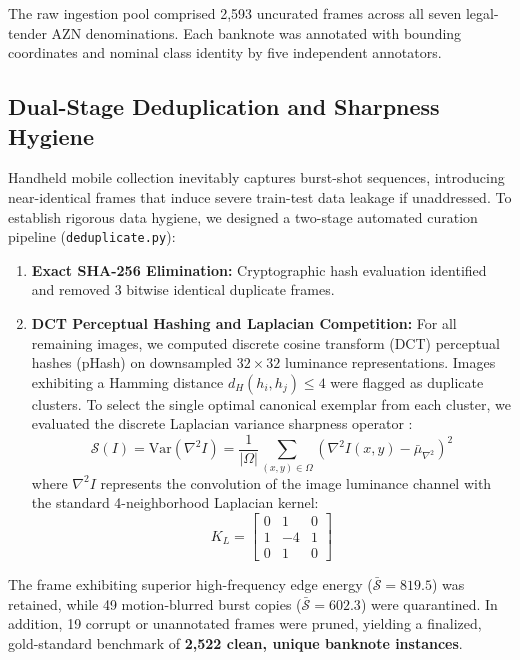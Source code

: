 \documentclass[conference]{IEEEtran}
\begin{document}
The raw ingestion pool comprised 2,593 uncurated frames across all seven legal-tender AZN denominations. Each banknote was annotated with bounding coordinates and nominal class identity by five independent annotators.

\subsection{Dual-Stage Deduplication and Sharpness Hygiene}
Handheld mobile collection inevitably captures burst-shot sequences, introducing near-identical frames that induce severe train-test data leakage if unaddressed. To establish rigorous data hygiene, we designed a two-stage automated curation pipeline (\texttt{deduplicate.py}):

\begin{enumerate}
    \item \textbf{Exact SHA-256 Elimination:} Cryptographic hash evaluation identified and removed 3 bitwise identical duplicate frames.
    \item \textbf{DCT Perceptual Hashing and Laplacian Competition:} For all remaining images, we computed discrete cosine transform (DCT) perceptual hashes (pHash) \cite{zauner2010implementation} on downsampled $32 \times 32$ luminance representations. Images exhibiting a Hamming distance $d_H(h_i, h_j) \le 4$ were flagged as duplicate clusters. To select the single optimal canonical exemplar from each cluster, we evaluated the discrete Laplacian variance sharpness operator \cite{pech2000diatom}:
    \begin{equation}
        \mathcal{S}(I) = \mathrm{Var}(\nabla^2 I) = \frac{1}{|\Omega|} \sum_{(x,y) \in \Omega} \left( \nabla^2 I(x,y) - \bar{\mu}_{\nabla^2} \right)^2
        \label{eq:laplacian}
    \end{equation}
    where $\nabla^2 I$ represents the convolution of the image luminance channel with the standard 4-neighborhood Laplacian kernel:
    \begin{equation}
        K_L = \begin{bmatrix} 0 & 1 & 0 \\ 1 & -4 & 1 \\ 0 & 1 & 0 \end{bmatrix}
    \end{equation}
\end{enumerate}
The frame exhibiting superior high-frequency edge energy ($\bar{\mathcal{S}} = 819.5$) was retained, while 49 motion-blurred burst copies ($\bar{\mathcal{S}} = 602.3$) were quarantined. In addition, 19 corrupt or unannotated frames were pruned, yielding a finalized, gold-standard benchmark of \textbf{2,522 clean, unique banknote instances}.
\end{document}
